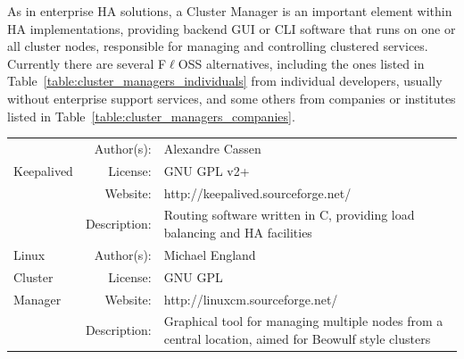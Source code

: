 \documentclass[a4paper, 12pt]{book}
\begin{document}
\noindent As in enterprise HA solutions, a Cluster Manager is an important element within HA implementations, providing backend GUI or CLI software that runs on one or all cluster nodes, responsible for managing and controlling clustered services. Currently there are several F$\ell$OSS alternatives, including the ones listed in Table~\ref{table:cluster_managers_individuals} from individual developers, usually without enterprise support services, and some others from companies or institutes listed in Table~\ref{table:cluster_managers_companies}.

\FloatBarrier
\begin{table}[H]
  \centering
  \begin{tabular}{ | m{2cm} | r  m{10cm} | }
    \hline    
		 & Author(s): &  Alexandre Cassen\\
      Keepalived & License: &  GNU GPL v2+\\
		 & Website: &  http://keepalived.sourceforge.net/\\
	 	 & Description: & Routing software written in C, providing load balancing and HA facilities\\
    \hline
	Linux	 & Author(s): & Michael England \\
	Cluster	 & License: & GNU GPL \\
	Manager	 & Website: & http://linuxcm.sourceforge.net/ \\
	 	 & Description: & Graphical tool for managing multiple nodes from a central location, aimed for Beowulf style clusters\\
    \hline

  \end{tabular}
\label{table:cluster_managers_individuals_}
\end{table}
\end{document}
